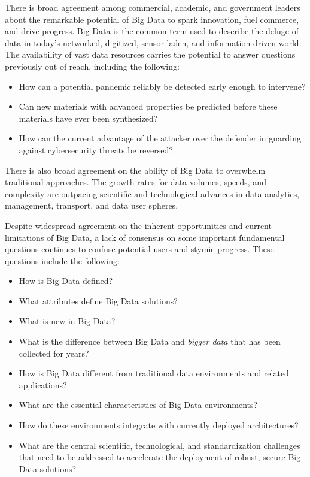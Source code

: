 \documentclass[9pt,]{article}
\providecommand{\tightlist}{%
  \setlength{\itemsep}{0pt}\setlength{\parskip}{0pt}}
\begin{document}
There is broad agreement among commercial, academic, and government
leaders about the remarkable potential of Big Data to spark innovation,
fuel commerce, and drive progress. Big Data is the common term used to
describe the deluge of data in today's networked, digitized,
sensor-laden, and information-driven world. The availability of vast
data resources carries the potential to answer questions previously out
of reach, including the following:

\begin{itemize}
\item
  How can a potential pandemic reliably be detected early enough to
  intervene?
\item
  Can new materials with advanced properties be predicted before these
  materials have ever been synthesized?
\item
  How can the current advantage of the attacker over the defender in
  guarding against cybersecurity threats be reversed?
\end{itemize}

There is also broad agreement on the ability of Big Data to overwhelm
traditional approaches. The growth rates for data volumes, speeds, and
complexity are outpacing scientific and technological advances in data
analytics, management, transport, and data user spheres.

Despite widespread agreement on the inherent opportunities and current
limitations of Big Data, a lack of consensus on some important
fundamental questions continues to confuse potential users and stymie
progress. These questions include the following:

\begin{itemize}
\tightlist
\item
  How is Big Data defined?
\item
  What attributes define Big Data solutions?
\item
  What is new in Big Data?
\item
  What is the difference between Big Data and \emph{bigger data} that
  has been collected for years?
\item
  How is Big Data different from traditional data environments and
  related applications?
\item
  What are the essential characteristics of Big Data environments?
\item
  How do these environments integrate with currently deployed
  architectures?
\item
  What are the central scientific, technological, and standardization
  challenges that need to be addressed to accelerate the deployment of
  robust, secure Big Data solutions?
\end{itemize}
\end{document}
